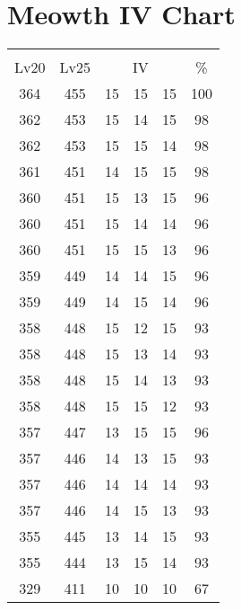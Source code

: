 \documentclass{article}%
\begin{document}
%
\normalsize%
\section{Meowth IV Chart}%
\label{sec:Meowth IV Chart}%
\renewcommand{\arraystretch}{1.5}%
\begin{tabular}{|c|c|c|c|c|c|}%
\hline%
\multicolumn{6}{|c|}{\textcolor{white}{ 
\linebreak{Meowth}
}%
\cellcolor{black}}\\%
\multicolumn{1}{|c}{Lv20}&\multicolumn{1}{c|}{Lv25}&\multicolumn{3}{c|}{IV}&\multicolumn{1}{|c|}{\%}\\%
\hline%
\rowcolor{color100}%
364&455&15&15&15&100\\%
\hline%
\rowcolor{color98}%
362&453&15&14&15&98\\%
\hline%
\rowcolor{color98}%
362&453&15&15&14&98\\%
\hline%
\rowcolor{color98}%
361&451&14&15&15&98\\%
\hline%
\rowcolor{color96}%
360&451&15&13&15&96\\%
\hline%
\rowcolor{color96}%
360&451&15&14&14&96\\%
\hline%
\rowcolor{color96}%
360&451&15&15&13&96\\%
\hline%
\rowcolor{color96}%
359&449&14&14&15&96\\%
\hline%
\rowcolor{color96}%
359&449&14&15&14&96\\%
\hline%
\rowcolor{color93}%
358&448&15&12&15&93\\%
\hline%
\rowcolor{color93}%
358&448&15&13&14&93\\%
\hline%
\rowcolor{color93}%
358&448&15&14&13&93\\%
\hline%
\rowcolor{color93}%
358&448&15&15&12&93\\%
\hline%
\rowcolor{color96}%
357&447&13&15&15&96\\%
\hline%
\rowcolor{color93}%
357&446&14&13&15&93\\%
\hline%
\rowcolor{color93}%
357&446&14&14&14&93\\%
\hline%
\rowcolor{color93}%
357&446&14&15&13&93\\%
\hline%
\rowcolor{color93}%
355&445&13&14&15&93\\%
\hline%
\rowcolor{color93}%
355&444&13&15&14&93\\%
\hline%
\rowcolor{color91}%
329&411&10&10&10&67\\%
\end{tabular}

%
\end{document}
